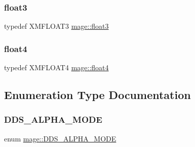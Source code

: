 \subsubsection{\texorpdfstring{float3}{float3}}
{\footnotesize\ttfamily typedef X\+M\+F\+L\+O\+A\+T3 \hyperlink{namespacemage_aab5dae4b0aaf8129b9e0d651d91d4b38}{mage\+::float3}}

\hypertarget{namespacemage_aa79484ea5211c29727b3794199ac0a55}{}\label{namespacemage_aa79484ea5211c29727b3794199ac0a55} 
\subsubsection{\texorpdfstring{float4}{float4}}
{\footnotesize\ttfamily typedef X\+M\+F\+L\+O\+A\+T4 \hyperlink{namespacemage_aa79484ea5211c29727b3794199ac0a55}{mage\+::float4}}



\subsection{Enumeration Type Documentation}
\hypertarget{namespacemage_a0c586a2bad862f4858900ca121ca80c2}{}\label{namespacemage_a0c586a2bad862f4858900ca121ca80c2} 
\subsubsection{\texorpdfstring{D\+D\+S\+\_\+\+A\+L\+P\+H\+A\+\_\+\+M\+O\+DE}{DDS\_ALPHA\_MODE}}
{\footnotesize\ttfamily enum \hyperlink{namespacemage_a0c586a2bad862f4858900ca121ca80c2}{mage\+::\+D\+D\+S\+\_\+\+A\+L\+P\+H\+A\+\_\+\+M\+O\+DE}}

